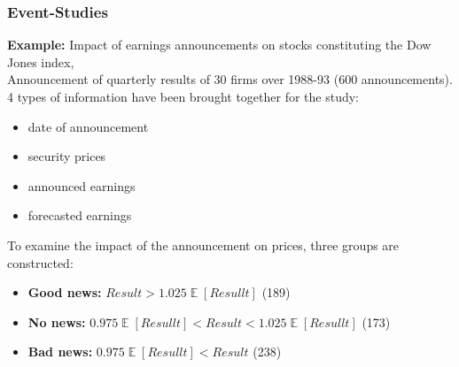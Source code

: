 \documentclass[xcolor=dvipsnames, english, 8pt]{beamer}
\DeclareMathOperator{\E}{\mathbb{E}}
\begin{document}
\begin{frame}
    \frametitle{Event-Studies}

\textbf{Example:} Impact of earnings announcements on stocks constituting the Dow Jones index, \cite{Campbell1997}\vspace{0.25cm}\\
Announcement of quarterly results of 30 firms over 1988-93 (600 announcements). 4 types of information have been brought together for the study:\vspace{0.25cm}\\
\begin{itemize}
    \item date of announcement
    \item security prices
    \item announced earnings
    \item forecasted earnings\vspace{0.5cm}\\
\end{itemize}
To examine the impact of the announcement on prices, three groups are constructed:\vspace{0.25cm}\\
\begin{itemize}
    \item \textbf{Good news:} $Result>1.025 \E[Resullt]$ (189)
    \item \textbf{No news:} $0.975\E[Resullt] <Result< 1.025\E[Resullt]$ (173)
    \item \textbf{Bad news:} $ 0.975\E[Resullt] <Result$ (238)
\end{itemize}

\end{frame}
\end{document}
